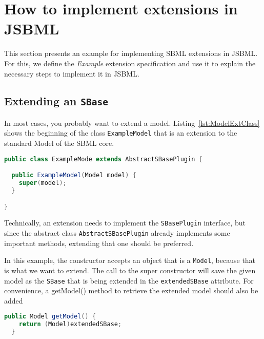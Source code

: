 \section{How to implement extensions in JSBML}
\label{sec:howToExtension}

This section presents an example for implementing SBML extensions in JSBML.
For this, we define the \emph{Example} extension specification and use it to explain the necessary steps to implement it in JSBML.

\subsection{Extending an \texttt{SBase}}
\label{subsec:extendingSBase}

In most cases, you probably want to extend a model.
Listing~\vref{lst:ModelExtClass} shows the beginning of the class \texttt{ExampleModel} that is an extension to the standard Model of the SBML core.
\begin{lstlisting}[language=Java,caption={Extending \texttt{AbstractSBasePlugin}},label={lst:ModelExtClass}]
public class ExampleMode extends AbstractSBasePlugin {

  public ExampleModel(Model model) {
    super(model);
  }

}
\end{lstlisting}
Technically, an extension needs to implement the \texttt{SBasePlugin} interface,
but since the abstract class \texttt{AbstractSBasePlugin} already implements some important methods, extending that one should be preferred.

In this example, the constructor accepts an object that is a \texttt{Model}, because that is what we want to extend.
The call to the super constructor will save the given model as the \texttt{SBase} that is being extended in the \texttt{extendedSBase} attribute.
For convenience, a getModel() method to retrieve the extended model should also be added
\begin{lstlisting}[language=Java,caption={Convenience method to retrieve the extended model},label={lst:ModelExtGetModel}]
  public Model getModel() {
    return (Model)extendedSBase;
  }
\end{lstlisting}


